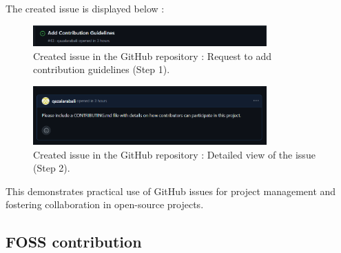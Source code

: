 \documentclass[12pt]{article}
\begin{document}
            The created issue is displayed below :

            \begin{figure}[H]
                \centering
                \includegraphics[width=0.8\textwidth]{assets/pictures/Requestـtoـaddـcontributionـguidelines.png}
                \caption{Created issue in the GitHub repository : Request to add contribution guidelines (Step 1).}
            \end{figure}

            \begin{figure}[H]
                \centering
                \includegraphics[width=0.8\textwidth]{assets/pictures/Detailedـviewـofـtheـissue.png}
                \caption{Created issue in the GitHub repository : Detailed view of the issue (Step 2).}
            \end{figure}

            This demonstrates practical use of GitHub issues for project management and fostering collaboration in open-source projects.

    \subsection{FOSS contribution}
\end{document}
